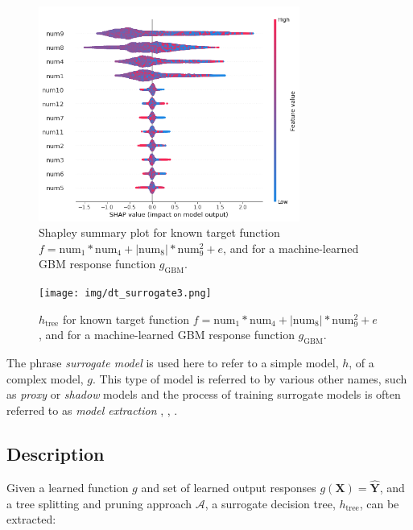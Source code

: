\documentclass{article}
\begin{document}
\begin{figure}
	\begin{center}
		\includegraphics[height=200pt]{img/global_shapley.png}
		\caption{Shapley summary plot for known target function $f = \text{num} _1 * \text{num}_4 + |\text{num}_8| * \text{num}_9^2 + e$, and for a machine-learned GBM response function $g_{\text{GBM}}$.}
		\label{fig:global_shapley}
	\end{center}
\end{figure}

\begin{figure}[t]
	\begin{center}
		\texttt{[image: img/dt\_surrogate3.png]}
		\caption{$h_{\text{tree}}$ for known target function $f = \text{num} _1 * \text{num}_4 + |\text{num}_8| * \text{num}_9^2 + e$, and for a machine-learned GBM response function $g_{\text{GBM}}$.}
		\label{fig:dt_surrogate}
	\end{center}
\end{figure}

The phrase \textit{surrogate model} is used here to refer to a simple model, $h$, of a complex model, $g$. This type of model is referred to by various other names, such as \textit{proxy} or \textit{shadow} models and the process of training surrogate models is often referred to as \textit{model extraction} \cite{dt_surrogate1}, \cite{ff_interpretability},  \cite{dt_surrogate2}. 

\subsection{Description}

Given a learned function $g$ and set of learned output responses $g(\mathbf{X}) = \mathbf{\hat{Y}}$, and a tree splitting and pruning approach $\mathcal{A}$, a surrogate decision tree, $h_{\text{tree}}$, can be extracted: 
\end{document}
